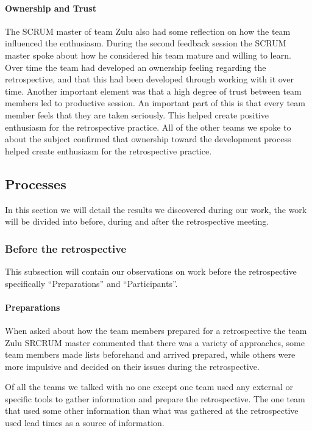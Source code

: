 \paragraph{Ownership and Trust}
The SCRUM master of team Zulu also had some reflection on how the team influenced the enthusiasm. During the second feedback session the SCRUM master spoke about how he considered his team mature and willing to learn. Over time the team had developed an ownership feeling regarding the retrospective, and that this had been developed through working with it over time. Another important element was that a high degree of trust between team members led to productive session. An important part of this is that every team member feels that they are taken seriously. This helped create positive enthusiasm for the retrospective practice. All of the other teams we spoke to about the subject confirmed that ownership toward the development process helped create enthusiasm for the retrospective practice. 

\subsection{Processes}
In this section we will detail the results we discovered during our work, the work will be divided into before, during and after the retrospective meeting.

\subsubsection{Before the retrospective}
This subsection will contain our observations on work before the retrospective specifically ``Preparations'' and ``Participants''.

\paragraph{Preparations}
When asked about how the team members prepared for a retrospective the team Zulu SRCRUM master commented that there was a variety of approaches, some team members made lists beforehand and arrived prepared, while others were more impulsive and decided on their issues during the retrospective.

\label{question-12}
Of all the teams we talked with no one except one team used any external or specific tools to gather information and prepare the retrospective. The one team that used some other information than what was gathered at the retrospective used lead times as a source of information. 

